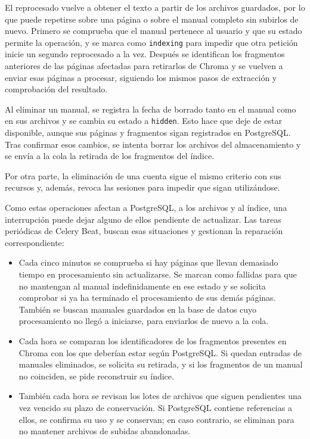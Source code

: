 El reprocesado vuelve a obtener el texto a partir de los archivos guardados,
por lo que puede repetirse sobre una página o sobre el manual completo sin
subirlos de nuevo. Primero se comprueba que el manual pertenece al usuario
y que su estado permite la operación, y se marca como \texttt{indexing}
para impedir que otra petición inicie un segundo reprocesado a la vez.
Después se identifican los fragmentos anteriores de las páginas afectadas
para retirarlos de Chroma y se vuelven a enviar esas páginas a procesar,
siguiendo los mismos pasos de extracción y comprobación del resultado.

Al eliminar un manual, se registra la fecha de borrado tanto en el manual
como en sus archivos y se cambia su estado a \texttt{hidden}. Esto hace
que deje de estar disponible, aunque sus páginas y fragmentos sigan
registrados en PostgreSQL. Tras confirmar esos cambios, se intenta borrar
los archivos del almacenamiento y se envía a la cola la retirada de los
fragmentos del índice.

Por otra parte, la eliminación de una cuenta sigue el mismo criterio
con sus recursos y, además, revoca las sesiones para impedir que sigan
utilizándose.

Como estas operaciones afectan a PostgreSQL, a los archivos y al índice,
una interrupción puede dejar alguno de ellos pendiente de actualizar.
Las tareas periódicas de Celery Beat, buscan esas situaciones y gestionan la reparación
correspondiente:

\begin{itemize}
    \item Cada cinco minutos se comprueba si hay páginas que llevan
    demasiado tiempo en procesamiento sin actualizarse. Se marcan como
    fallidas para que no mantengan al manual indefinidamente en ese estado
    y se solicita comprobar si ya ha terminado el procesamiento de sus
    demás páginas. También se buscan manuales guardados en la base de datos
    cuyo procesamiento no llegó a iniciarse, para enviarlos de nuevo a la
    cola.
    \item Cada hora se comparan los identificadores de los fragmentos
    presentes en Chroma con los que deberían estar según PostgreSQL. Si
    quedan entradas de manuales eliminados, se solicita su retirada, y si
    los fragmentos de un manual no coinciden, se pide reconstruir su índice.
    \item También cada hora se revisan los lotes de archivos que siguen
    pendientes una vez vencido su plazo de conservación. Si PostgreSQL
    contiene referencias a ellos, se confirma su uso y se conservan;
    en caso contrario, se eliminan para no mantener archivos de subidas
    abandonadas.
\end{itemize}

